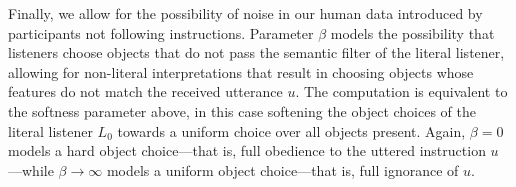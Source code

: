 \documentclass[10pt,a4paper]{article}
\begin{document}

Finally, we allow for the possibility of noise in our human data introduced by participants not following instructions.
Parameter $\beta$ models the possibility that listeners choose objects that do not pass the semantic filter of the literal listener, allowing for non-literal interpretations that result in choosing objects whose features do not match the received utterance $u$. 
The computation is equivalent to the softness parameter above, in this case softening the object choices of the literal listener $L_0$ towards a uniform choice over all objects present. 
Again, $\beta=0$ models a hard object choice---that is, full obedience to the uttered instruction $u$---while $\beta \rightarrow \infty$ models a uniform object choice---that is, full ignorance of $u$.
\end{document}
